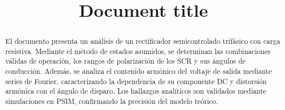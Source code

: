 \documentclass[conference]{IEEEtran}
\begin{document}
%
\title{Document title}

\author{
\and
{}
\and
{}
}


\maketitle

\thispagestyle{firststyle}
\renewcommand{\headrulewidth}{0in}
\pagestyle{empty}


\pagestyle{fancy}
\chead{\fontsize{8}{10} \selectfont \textit{} }



\begin{abstract}
El documento presenta un análisis de un rectificador semicontrolado trifásico con carga resistiva. Mediante el método de estados asumidos, se determinan las combinaciones válidas de operación,
los rangos de polarización de los SCR y sus ángulos de conducción. Además, se analiza el contenido armónico del voltaje de salida mediante series de Fourier, caracterizando la dependencia de su
componente DC y distorsión armónica con el ángulo de disparo. Los hallazgos analíticos son validados mediante simulaciones en PSIM, confirmando la precisión del modelo teórico.
\end{abstract}
\end{document}
